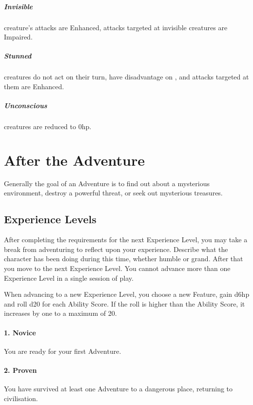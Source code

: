 \documentclass[itdr]{subfiles}
\begin{document}
\subparagraph{Invisible} creature's attacks are Enhanced, attacks targeted at invisible creatures are Impaired.

\subparagraph{Stunned} creatures do not act on their turn, have disadvantage on , and attacks targeted at them are Enhanced.

\subparagraph{Unconscious} creatures are reduced to 0hp.

\vfill
\break

\section{After the Adventure}

Generally the goal of an Adventure is to find out about a mysterious environment, destroy a powerful threat, or seek out mysterious treasures.

\subsection{Experience Levels}
After completing the requirements for the next Experience Level, you may take a break from adventuring to reflect upon your experience. Describe what the character has been doing during this time, whether humble or grand. After that you move to the next Experience Level. You cannot advance more than one Experience Level in a single session of play.

When advancing to a new Experience Level, you choose a new Feature, gain d6hp and roll d20 for each Ability Score. If the roll is higher than the Ability Score, it increases by one to a maximum of 20.

\paragraph{1. Novice}
You are ready for your first Adventure.

\paragraph{2. Proven}
You have survived at least one Adventure to a dangerous place, returning to civilisation.
\end{document}
